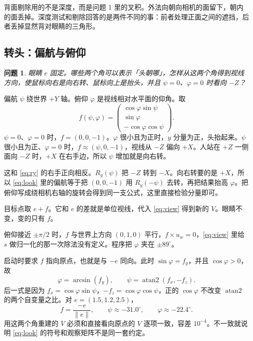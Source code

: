 \documentclass[12pt,a4paper]{article}
\theoremstyle{definition}
\theoremstyle{plain}
\newtheorem{problem}{问题}[section]
\theoremstyle{remark}
\begin{document}
背面剔除用的不是深度，而是问题 1 里的叉积。外法向朝向相机的面留下，朝内的面丢掉。深度测试和剔除回答的是两件不同的事：前者处理正面之间的遮挡，后者丢掉显然背对眼睛的三角形。

\subsection{转头：偏航与俯仰}

\begin{problem}
眼睛 $e$ 固定。哪些两个角可以表示「头朝哪」，怎样从这两个角得到视线方向，使鼠标向右是向右转、鼠标向上是抬头，并且 $\psi=0$、$\varphi=0$ 时看向 $-Z$？
\end{problem}

偏航 $\psi$ 绕世界 $+Y$ 轴。俯仰 $\varphi$ 是视线相对水平面的仰角。取
\begin{equation}
f(\psi,\varphi)=
\begin{pmatrix}
\cos\varphi\sin\psi\\
\sin\varphi\\
-\cos\varphi\cos\psi
\end{pmatrix}.
\label{eq:look}
\end{equation}
$\psi=0$、$\varphi=0$ 时，$f=(0,0,-1)$。$\varphi$ 很小且为正时，$y$ 分量为正，头抬起来。$\psi$ 很小且为正、$\varphi=0$ 时，$f\approx(\psi,0,-1)$，视线从 $-Z$ 偏向 $+X$。人站在 $+Z$ 一侧面向 $-Z$ 时，$+X$ 在右手边，所以 $\psi$ 增加就是向右转。

这和 \eqref{eq:ry} 的右手正向相反。$R_y(\psi)$ 把 $-Z$ 转到 $-X$。向右转要的是 $+X$，所以 \eqref{eq:look} 里的偏航等于把 $(0,0,-1)$ 用 $R_y(-\psi)$ 去转，再把结果抬高 $\varphi$。把俯仰写成绕相机右轴的旋转会得到同一支公式，这里直接检验分量即可。

目标点取 $e+f$。它和 $e$ 的差就是单位视线，代入 \eqref{eq:view} 得到新的 $V$。眼睛不变，变的只有 $f$。

俯仰接近 $\pm\pi/2$ 时，$f$ 与世界上方向 $(0,1,0)$ 平行，$f\times u_w=0$，\eqref{eq:view} 里给 $s$ 做归一化的那一次除法没有定义。程序把 $\varphi$ 夹在 $\pm 89^\circ$。

启动时要求 $f$ 指向原点，也就是与 $-e$ 同向。此时 $\sin\varphi=f_y$，并且 $\cos\varphi>0$，故
\[
\varphi=\arcsin(f_y),\qquad
\psi=\operatorname{atan2}(f_x,-f_z).
\]
后一式是因为 $f_x=\cos\varphi\sin\psi$，$-f_z=\cos\varphi\cos\psi$，正的 $\cos\varphi$ 不改变 $\operatorname{atan2}$ 的两个自变量之比。对 $e=(1.5,1.2,2.5)$，
\[
f=\frac{-e}{\lVert e\rVert},\qquad
\psi\approx -31.0^\circ,\qquad
\varphi\approx -22.4^\circ.
\]
用这两个角重建的 $V$ 必须和直接看向原点的 $V$ 逐项一致，容差 $10^{-4}$。不一致就说明 \eqref{eq:look} 的符号和观察矩阵不是同一套约定。
\end{document}
